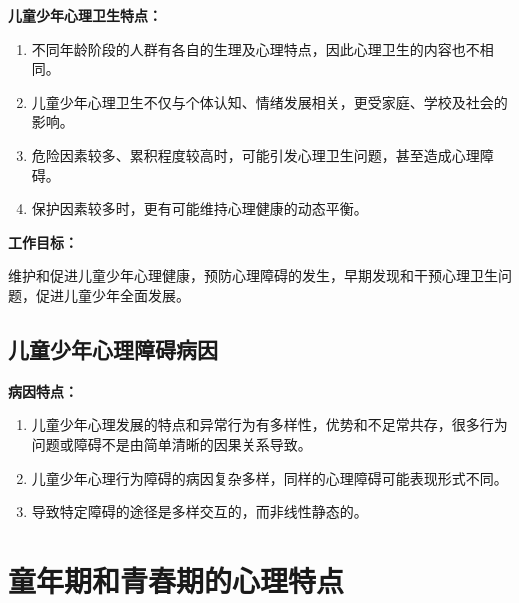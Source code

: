 \begin{keybox}
\textbf{儿童少年心理卫生特点：}

\begin{enumerate}[leftmargin=*]
    \item 不同年龄阶段的人群有各自的生理及心理特点，因此心理卫生的内容也不相同。
    \item 儿童少年心理卫生不仅与个体认知、情绪发展相关，更受家庭、学校及社会的影响。
    \item 危险因素较多、累积程度较高时，可能引发心理卫生问题，甚至造成心理障碍。
    \item 保护因素较多时，更有可能维持心理健康的动态平衡。
\end{enumerate}

\textbf{工作目标：}

维护和促进儿童少年心理健康，预防心理障碍的发生，早期发现和干预心理卫生问题，促进儿童少年全面发展。
\end{keybox}

\subsection{儿童少年心理障碍病因}

\begin{tipbox}
\textbf{病因特点：}

\begin{enumerate}[leftmargin=*]
    \item 儿童少年心理发展的特点和异常行为有多样性，优势和不足常共存，很多行为问题或障碍不是由简单清晰的因果关系导致。
    \item 儿童少年心理行为障碍的病因复杂多样，同样的心理障碍可能表现形式不同。
    \item 导致特定障碍的途径是多样交互的，而非线性静态的。
\end{enumerate}
\end{tipbox}

\section{童年期和青春期的心理特点}\difficulty

